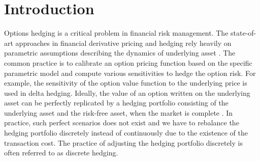 \documentclass[letterpaper,12pt,titlepage,oneside,final]{book}
\numberwithin{equation}{section}
\theoremstyle{definition}
\begin{document}


\chapter{Introduction}
Options hedging is a critical problem in financial risk management. The state-of-art approaches in financial derivative pricing and hedging rely heavily on parametric assumptions describing the dynamics of underlying asset .  The common practice is to calibrate an option pricing function based on the specific parametric model and compute various sensitivities to hedge the option risk. For example, the sensitivity of the option value function to the underlying price is used in delta hedging. Ideally, the value of an option written on the underlying asset can be perfectly replicated by a hedging portfolio consisting of the underlying asset and the  risk-free asset, when the market is complete \cite{shreve2004stochastic}.  In practice, such perfect scenarios does not exist and we have to rebalance the hedging portfolio discretely instead of continuously due to the existence of the transaction cost.  The practice of adjusting the hedging portfolio discretely is often referred to as discrete hedging.
\end{document}
